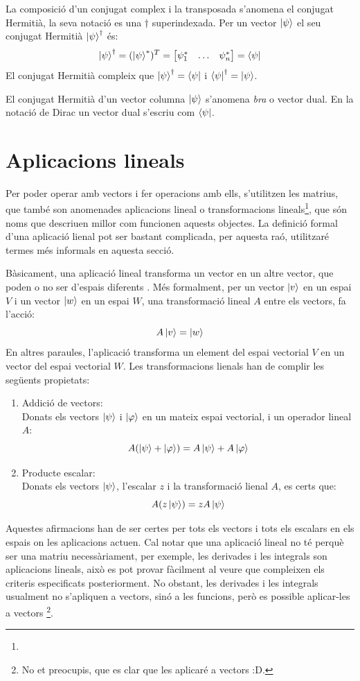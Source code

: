 La composició d'un conjugat complex i la transposada s'anomena el conjugat Hermitià, la seva notació es una $\dagger$ superindexada. Per un vector $\ket{\psi}$ el seu conjugat Hermitià $\ket{\psi}^\dagger$ és:
$$
\ket{\psi}^\dagger = (\ket{\psi}^*)^T =  \begin{bmatrix} \psi_{1}^* & \dots & \psi_{n}^* \end{bmatrix} = \bra{\psi}
$$
El conjugat Hermitià compleix que $\ket{\psi}^\dagger = \bra{\psi}$ i $\bra{\psi}^\dagger = \ket{\psi}$.

El conjugat Hermitià d'un vector columna $\ket{\psi}$ s'anomena \textit{bra} o vector dual. En la notació de Dirac un vector dual s'escriu com $\bra{\psi}$.

\section{Aplicacions lineals}
Per poder operar amb vectors i fer operacions amb ells, s'utilitzen les matrius, que també son anomenades aplicacions lineal o transformacions lineals\footnote{}, que són noms que descriuen millor com funcionen aquests objectes. La definició formal d'una aplicació lienal pot ser bastant complicada, per aquesta raó, utilitzaré termes més informals en aquesta secció. 

Bàsicament, una aplicació lineal transforma un vector en un altre vector, que poden o no ser d'espais diferents \cite{LR_done_right:linear_map}. Més formalment, per un vector $\ket{v}$ en un espai $V$ i un vector $\ket{w}$ en un espai $W$, una transformació lineal $A$ entre els vectors, fa l'acció:
$$
A \ket{v} = \ket{w}
$$
En altres paraules, l'aplicació transforma un element del espai vectorial $V$ en un vector del espai vectorial $W$.
Les transformacions lienals han de complir les següents propietats:
\begin{enumerate}
	\item Addició de vectors: \\
	Donats els vectors $\ket{\psi}$ i $\ket{\varphi}$ en un mateix espai vectorial, i un operador lineal $A$:
	$$ A(\ket{\psi} + \ket{\varphi}) = A\ket{\psi} + A\ket{\varphi}$$ 
	\item Producte escalar:\\
	Donats els vectors $\ket{\psi}$, l'escalar $z$ i la transformació lienal $A$, es certs que:
	$$ A(z\ket{\psi}) = z A \ket{\psi}$$
\end{enumerate}

Aquestes afirmacions han de ser certes per tots els vectors i tots els escalars en els espais on les aplicacions actuen. Cal notar que una aplicació lineal no té perquè ser una matriu necessàriament, per exemple, les derivades i les integrals son aplicacions lineals, això es pot provar fàcilment al veure que compleixen els criteris especificats posteriorment. No obstant, les derivades i les integrals usualment no s'apliquen a vectors, sinó a les funcions, però es possible aplicar-les a vectors \footnote{No et preocupis, que es clar que les aplicaré a vectors :D.}.

